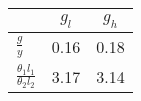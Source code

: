 \begin{tiny}\begin{tabular}{|l|c|c|}
\hline
&\textbf{$g_l$}&\textbf{$g_h$}\\\hline
\textbf{$\frac{g}{y}$}&0.16&0.18\\\hline
\textbf{$\frac{\theta_1 l_1}{\theta_2 l_2}$}&3.17&3.14\\\hline
\end{tabular}
\end{tiny}
